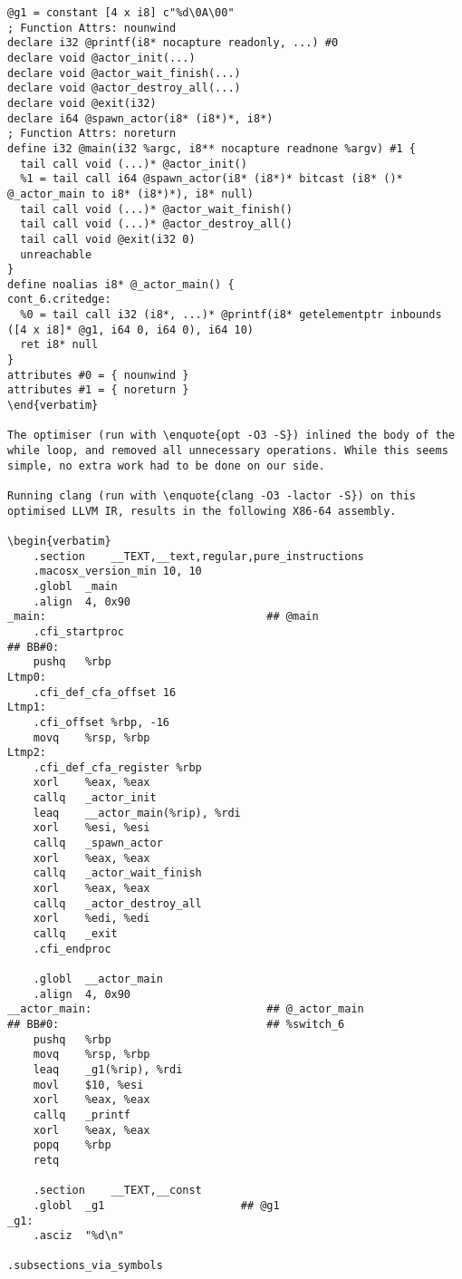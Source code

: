\begin{lstlisting}[breaklines]
@g1 = constant [4 x i8] c"%d\0A\00"
; Function Attrs: nounwind
declare i32 @printf(i8* nocapture readonly, ...) #0
declare void @actor_init(...)
declare void @actor_wait_finish(...)
declare void @actor_destroy_all(...)
declare void @exit(i32)
declare i64 @spawn_actor(i8* (i8*)*, i8*)
; Function Attrs: noreturn
define i32 @main(i32 %argc, i8** nocapture readnone %argv) #1 {
  tail call void (...)* @actor_init()
  %1 = tail call i64 @spawn_actor(i8* (i8*)* bitcast (i8* ()* @_actor_main to i8* (i8*)*), i8* null)
  tail call void (...)* @actor_wait_finish()
  tail call void (...)* @actor_destroy_all()
  tail call void @exit(i32 0)
  unreachable
}
define noalias i8* @_actor_main() {
cont_6.critedge:
  %0 = tail call i32 (i8*, ...)* @printf(i8* getelementptr inbounds ([4 x i8]* @g1, i64 0, i64 0), i64 10)
  ret i8* null
}
attributes #0 = { nounwind }
attributes #1 = { noreturn }
\end{verbatim}

The optimiser (run with \enquote{opt -O3 -S}) inlined the body of the while loop, and removed all unnecessary operations. While this seems simple, no extra work had to be done on our side. 

Running clang (run with \enquote{clang -O3 -lactor -S}) on this optimised LLVM IR, results in the following X86-64 assembly.

\begin{verbatim}
	.section	__TEXT,__text,regular,pure_instructions
	.macosx_version_min 10, 10
	.globl	_main
	.align	4, 0x90
_main:                                  ## @main
	.cfi_startproc
## BB#0:
	pushq	%rbp
Ltmp0:
	.cfi_def_cfa_offset 16
Ltmp1:
	.cfi_offset %rbp, -16
	movq	%rsp, %rbp
Ltmp2:
	.cfi_def_cfa_register %rbp
	xorl	%eax, %eax
	callq	_actor_init
	leaq	__actor_main(%rip), %rdi
	xorl	%esi, %esi
	callq	_spawn_actor
	xorl	%eax, %eax
	callq	_actor_wait_finish
	xorl	%eax, %eax
	callq	_actor_destroy_all
	xorl	%edi, %edi
	callq	_exit
	.cfi_endproc

	.globl	__actor_main
	.align	4, 0x90
__actor_main:                           ## @_actor_main
## BB#0:                                ## %switch_6
	pushq	%rbp
	movq	%rsp, %rbp
	leaq	_g1(%rip), %rdi
	movl	$10, %esi
	xorl	%eax, %eax
	callq	_printf
	xorl	%eax, %eax
	popq	%rbp
	retq

	.section	__TEXT,__const
	.globl	_g1                     ## @g1
_g1:
	.asciz	"%d\n"

.subsections_via_symbols
\end{lstlisting}